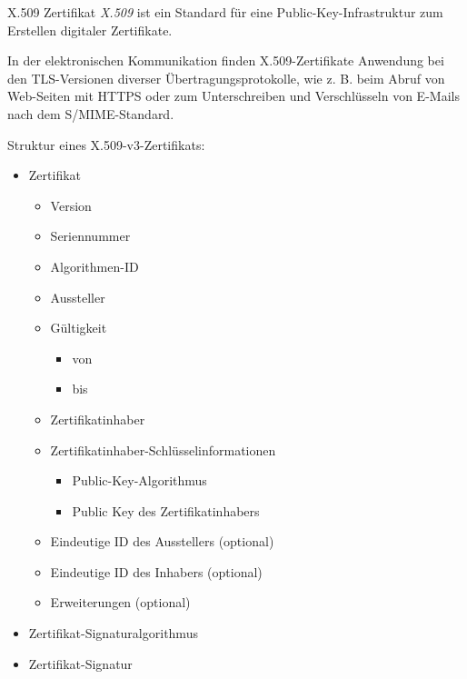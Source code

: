\begin{bonus}{X.509 Zertifikat}
    \emph{X.509} ist ein Standard für eine Public-Key-Infrastruktur zum Erstellen digitaler Zertifikate.

    In der elektronischen Kommunikation finden X.509-Zertifikate Anwendung bei den TLS-Versionen diverser Übertragungsprotokolle, wie z. B. beim Abruf von Web-Seiten mit HTTPS oder zum Unterschreiben und Verschlüsseln von E-Mails nach dem S/MIME-Standard.

    Struktur eines X.509-v3-Zertifikats:
    \begin{itemize}
        \item Zertifikat
              \begin{itemize}
                  \item Version
                  \item Seriennummer
                  \item Algorithmen-ID
                  \item Aussteller
                  \item Gültigkeit
                        \begin{itemize}
                            \item von
                            \item bis
                        \end{itemize}
                  \item Zertifikatinhaber
                  \item Zertifikatinhaber-Schlüsselinformationen
                        \begin{itemize}
                            \item Public-Key-Algorithmus
                            \item Public Key des Zertifikatinhabers
                        \end{itemize}
                  \item Eindeutige ID des Ausstellers (optional)
                  \item Eindeutige ID des Inhabers (optional)
                  \item Erweiterungen (optional)
              \end{itemize}
        \item Zertifikat-Signaturalgorithmus
        \item Zertifikat-Signatur
    \end{itemize}
\end{bonus}

